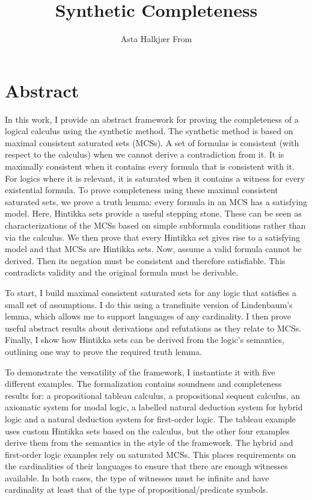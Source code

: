 \documentclass[11pt,a4paper,oneside]{book}
\begin{document}
\title{Synthetic Completeness}
\author{Asta Halkjær From}
\maketitle

\setcounter{page}{2}

\chapter*{Abstract}

In this work, I provide an abstract framework for proving the completeness of a logical calculus using the synthetic method.
The synthetic method is based on maximal consistent saturated sets (MCSs).
A set of formulas is consistent (with respect to the calculus) when we cannot derive a contradiction from it.
It is maximally consistent when it contains every formula that is consistent with it.
For logics where it is relevant, it is saturated when it contains a witness for every existential formula.
To prove completeness using these maximal consistent saturated sets, we prove a truth lemma: every formula in an MCS has a satisfying model.
Here, Hintikka sets provide a useful stepping stone.
These can be seen as characterizations of the MCSs based on simple subformula conditions rather than via the calculus.
We then prove that every Hintikka set gives rise to a satisfying model and that MCSs are Hintikka sets.
Now, assume a valid formula cannot be derived.
Then its negation must be consistent and therefore satisfiable.
This contradicts validity and the original formula must be derivable.

To start, I build maximal consistent saturated sets for any logic that satisfies a small set of assumptions.
I do this using a transfinite version of Lindenbaum's lemma, which allows me to support languages of any cardinality.
I then prove useful abstract results about derivations and refutations as they relate to MCSs.
Finally, I show how Hintikka sets can be derived from the logic's semantics, outlining one way to prove the required truth lemma.

To demonstrate the versatility of the framework, I instantiate it with five different examples.
The formalization contains soundness and completeness results for:
a propositional tableau calculus,
a propositional sequent calculus,
an axiomatic system for modal logic,
a labelled natural deduction system for hybrid logic and
a natural deduction system for first-order logic.
The tableau example uses custom Hintikka sets based on the calculus, but the other four examples derive them from the semantics in the style of the framework.
The hybrid and first-order logic examples rely on saturated MCSs.
This places requirements on the cardinalities of their languages to ensure that there are enough witnesses available.
In both cases, the type of witnesses must be infinite and have cardinality at least that of the type of propositional/predicate symbols.
\end{document}
